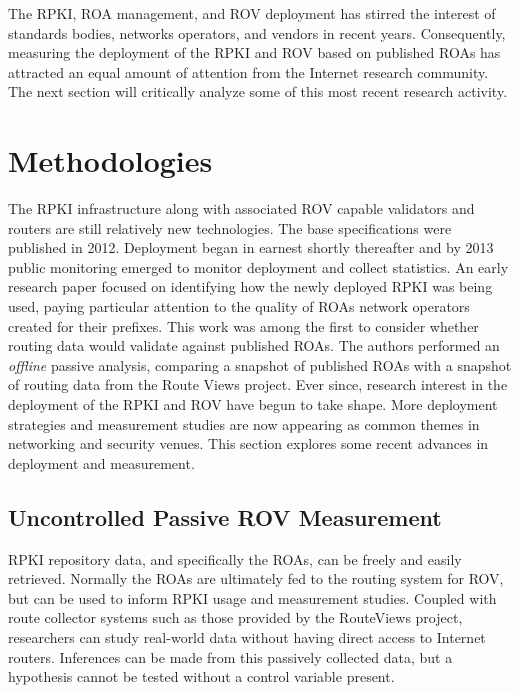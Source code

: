 \documentclass[sigconf]{acmart}
\begin{document}
The RPKI, ROA management, and ROV deployment has stirred the interest of
standards bodies, networks operators, and vendors in recent years.
Consequently, measuring the deployment of the RPKI and ROV based on
published ROAs has attracted an equal amount of attention from the
Internet research community.  The next section will critically analyze
some of this most recent research activity.

\section{Methodologies}\label{sec:Methodologies}

The RPKI infrastructure along with associated ROV capable validators
and routers are still relatively new technologies.  The base
specifications were published in 2012.  Deployment began in earnest
shortly thereafter and by 2013 public monitoring emerged to monitor
deployment and collect statistics.\cite{nist_rpki_2019}  An early
research paper focused on identifying how the newly deployed RPKI was
being used, paying particular attention to the quality of ROAs network
operators created for their prefixes.\cite{iamartino_measuring_2015}
This work was among the first to consider whether routing data would
validate against published ROAs.  The authors performed an
\emph{offline} passive analysis, comparing a snapshot of published ROAs
with a snapshot of routing data from the Route Views
project.\cite{oregon_routeviews_2019}  Ever since, research interest in
the deployment of the RPKI and ROV have begun to take shape.  More
deployment strategies and measurement studies are now appearing as
common themes in networking and security venues.  This section explores
some recent advances in deployment and measurement.

\subsection{Uncontrolled Passive ROV Measurement}

RPKI repository data, and specifically the ROAs, can be freely and
easily retrieved.  Normally the ROAs are ultimately fed to the routing
system for ROV, but can be used to inform RPKI usage and measurement
studies.  Coupled with route collector systems such as those provided by
the RouteViews project, researchers can study real-world data without
having direct access to Internet routers.  Inferences can be made from
this passively collected data, but a hypothesis cannot be tested without
a control variable present.
\end{document}
